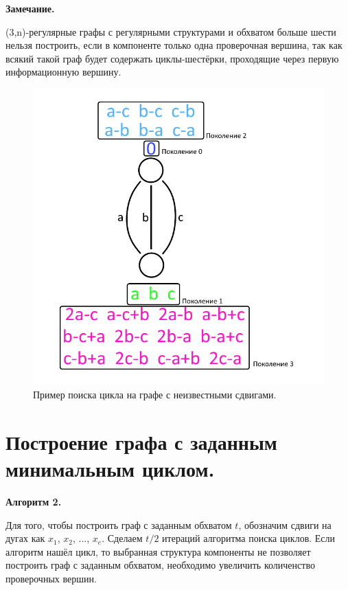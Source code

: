 \documentclass[14pt]{mmcs_article}
\begin{document}
\textbf{Замечание.}

(3,n)-регулярные графы с регулярными структурами и обхватом больше шести нельзя построить, если в компоненте только одна проверочная вершина, так как всякий такой граф будет содержать циклы-шестёрки, проходящие через первую информационную вершину.
 
\begin{figure}[H]
  \centering
  \includegraphics[scale=0.4]{Fig_5.png}
  \caption{ Пример поиска цикла на графе с неизвестными сдвигами. }
  \label{image:5}
\end{figure}
   
\newpage

\section{Построение графа с заданным минимальным циклом.}

\textbf{Алгоритм 2.}

Для того, чтобы построить граф с заданным обхватом $t$, обозначим сдвиги на дугах как $x_1$, $x_2$, ..., $x_e$. Сделаем $t/2$ итераций алгоритма поиска циклов. Если алгоритм нашёл цикл, то выбранная структура компоненты не позволяет построить граф с заданным обхватом, необходимо увеличить количенство проверочных вершин.
\end{document}
